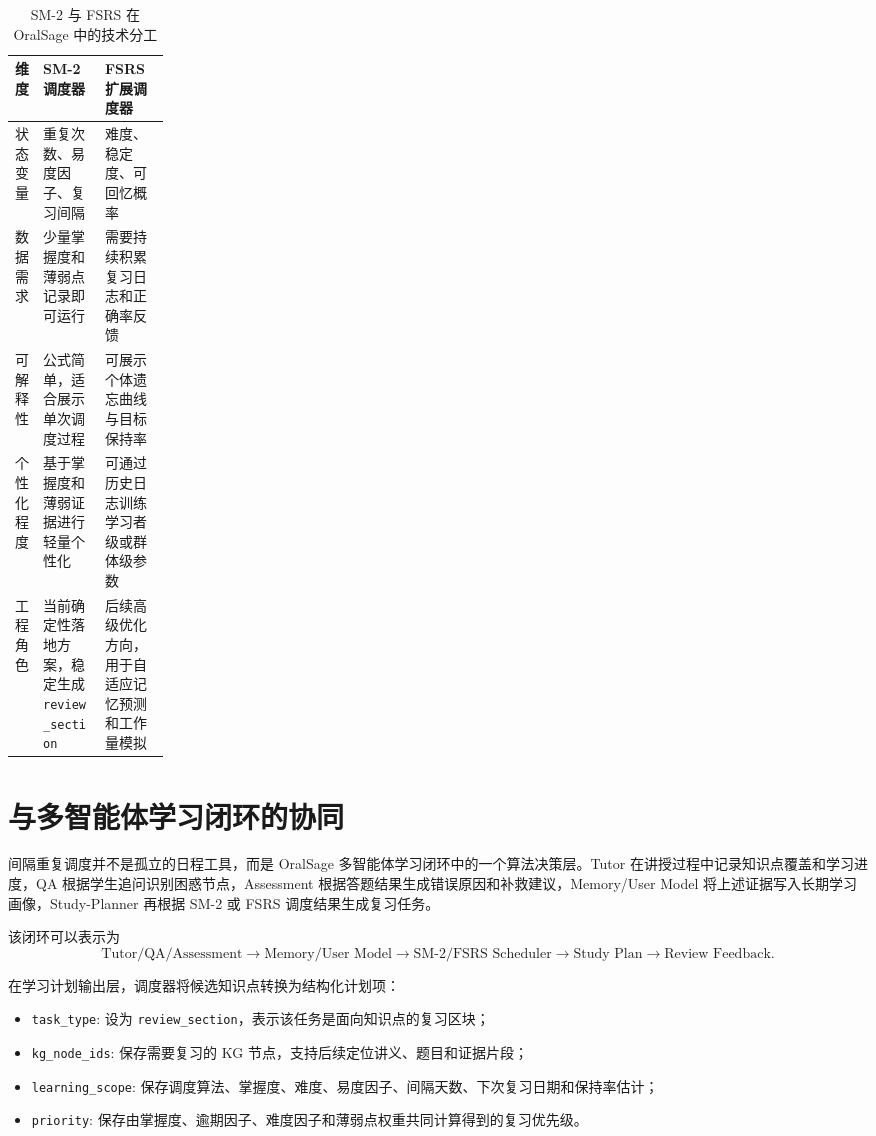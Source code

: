 \begin{table}[H]
  \centering
  \caption{SM-2 与 FSRS 在 OralSage 中的技术分工}
  \label{tab:sm2-fsrs-comparison}
  \begin{tabularx}{\linewidth}{p{0.18\linewidth}X X}
    \toprule
    维度 & SM-2 调度器 & FSRS 扩展调度器 \\
    \midrule
    状态变量 & 重复次数、易度因子、复习间隔 & 难度、稳定度、可回忆概率 \\
    数据需求 & 少量掌握度和薄弱点记录即可运行 & 需要持续积累复习日志和正确率反馈 \\
    可解释性 & 公式简单，适合展示单次调度过程 & 可展示个体遗忘曲线与目标保持率 \\
    个性化程度 & 基于掌握度和薄弱证据进行轻量个性化 & 可通过历史日志训练学习者级或群体级参数 \\
    工程角色 & 当前确定性落地方案，稳定生成 \texttt{review\_section} & 后续高级优化方向，用于自适应记忆预测和工作量模拟 \\
    \bottomrule
  \end{tabularx}
\end{table}

\section{与多智能体学习闭环的协同}

间隔重复调度并不是孤立的日程工具，而是 OralSage 多智能体学习闭环中的一个算法决策层。Tutor 在讲授过程中记录知识点覆盖和学习进度，QA 根据学生追问识别困惑节点，Assessment 根据答题结果生成错误原因和补救建议，Memory/User Model 将上述证据写入长期学习画像，Study-Planner 再根据 SM-2 或 FSRS 调度结果生成复习任务。

该闭环可以表示为
\[
\text{Tutor/QA/Assessment}
\rightarrow
\text{Memory/User Model}
\rightarrow
\text{SM-2/FSRS Scheduler}
\rightarrow
\text{Study Plan}
\rightarrow
\text{Review Feedback}.
\]

在学习计划输出层，调度器将候选知识点转换为结构化计划项：
\begin{itemize}
  \item \texttt{task\_type}: 设为 \texttt{review\_section}，表示该任务是面向知识点的复习区块；
  \item \texttt{kg\_node\_ids}: 保存需要复习的 KG 节点，支持后续定位讲义、题目和证据片段；
  \item \texttt{learning\_scope}: 保存调度算法、掌握度、难度、易度因子、间隔天数、下次复习日期和保持率估计；
  \item \texttt{priority}: 保存由掌握度、逾期因子、难度因子和薄弱点权重共同计算得到的复习优先级。
\end{itemize}

